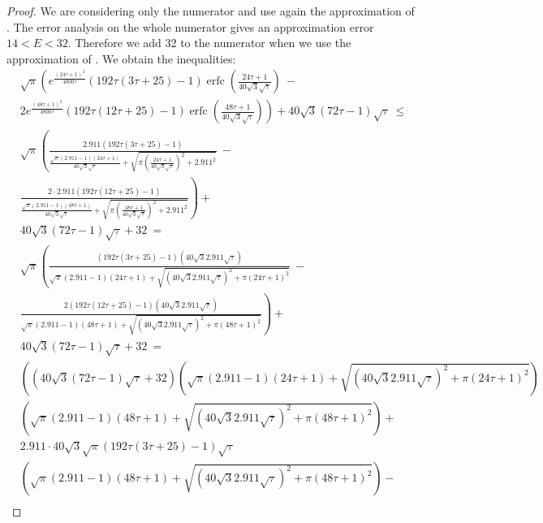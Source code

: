\documentclass{article}
\renewcommand{\leq}{\leqslant}
\DeclareMathOperator{\erfc}{erfc}
\begin{document}
\begin{proof}
We are considering only the numerator and use again the approximation
of \citet{Ren:07}.
The error analysis on the whole numerator gives an approximation error $14<E<32$. Therefore
we add 32 to the numerator when we use the approximation of \citet{Ren:07}.
We obtain the inequalities:
\begin{align}
&\sqrt{\pi } \left(e^{\frac{(24 \tau+1)^2}{4800 \tau}} (192  \tau (3 \tau+25)-1) \erfc \left(\frac{24 \tau+1}{40 \sqrt{3} \sqrt{\tau}}\right)\ -\right.\\\nonumber 
&\left.2 e^{\frac{(48 \tau+1)^2}{4800 \tau}} (192  \tau (12  \tau+25)-1) \erfc \left(\frac{48 \tau+1}{40 \sqrt{3} \sqrt{\tau}}\right)\right)+40 \sqrt{3} (72  \tau-1) \sqrt{\tau}\ \leq \\ \nonumber 
&  \sqrt{\pi } \left(\frac{2.911 (192  \tau (3 \tau+25)-1)}{\frac{\sqrt{\pi } (2.911 -1) (24 \tau+1)}{40 \sqrt{3} \sqrt{\tau}}+\sqrt{\pi  \left(\frac{24 \tau+1}{40 \sqrt{3} \sqrt{\tau}}\right)^2+2.911^2}} \ -\right.\\\nonumber 
&\left.\frac{2 \cdot 2.911 (192  \tau (12  \tau+25)-1)}{\frac{\sqrt{\pi } (2.911 -1) (48 \tau+1)}{40 \sqrt{3} \sqrt{\tau}}+\sqrt{\pi  \left(\frac{48 \tau+1}{40 \sqrt{3} \sqrt{\tau}}\right)^2+2.911^2}}\right)+\\ \nonumber 
&40 \sqrt{3} (72  \tau-1) \sqrt{\tau}+32\ = \\ \nonumber 
&\sqrt{\pi } \left(\frac{(192  \tau (3 \tau+25)-1) \left(40 \sqrt{3} 2.911 \sqrt{\tau}\right)}{\sqrt{\pi } (2.911 -1) (24 \tau+1)+\sqrt{\left(40 \sqrt{3} 2.911 \sqrt{\tau}\right)^2+\pi  (24 \tau+1)^2}} \ -\right.\\\nonumber 
&\left.\frac{2 (192  \tau (12  \tau+25)-1) \left(40 \sqrt{3} 2.911 \sqrt{\tau}\right)}{\sqrt{\pi } (2.911 -1) (48 \tau+1)+\sqrt{\left(40 \sqrt{3} 2.911 \sqrt{\tau}\right)^2+\pi  (48 \tau+1)^2}}\right)+\\ \nonumber 
&40 \sqrt{3} (72  \tau-1) \sqrt{\tau}+32\ = \\ \nonumber 
&\left(\left(40 \sqrt{3} (72  \tau-1) \sqrt{\tau}+32\right) \left(\sqrt{\pi } (2.911 -1) (24 \tau+1)+\sqrt{\left(40 \sqrt{3} 2.911 \sqrt{\tau}\right)^2+\pi  (24 \tau+1)^2}\right) \right.\\\nonumber 
&\left. \left(\sqrt{\pi } (2.911 -1) (48 \tau+1)+\sqrt{\left(40 \sqrt{3} 2.911 \sqrt{\tau}\right)^2+\pi  (48 \tau+1)^2}\right)+\right.\\\nonumber 
&\left.2.911 \cdot 40 \sqrt{3} \sqrt{\pi } (192  \tau (3 \tau+25)-1) \sqrt{\tau}   \right.\\\nonumber 
&\left.\left(\sqrt{\pi } (2.911 -1) (48 \tau+1)+\sqrt{\left(40 \sqrt{3} 2.911 \sqrt{\tau}\right)^2+\pi  (48 \tau+1)^2}\right)- \right.\\\nonumber 

\end{align}
\end{proof}
\end{document}
